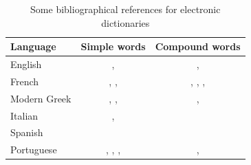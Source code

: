 \begin{table}[!h]
\begin{center}
\begin{tabular}{|l|c|c|}
\hline
\textbf{Language} & \textbf{Simple words} & \textbf{Compound words} \\
\hline
English & \cite{klarsfeld}, \cite{monceaux-1995} & \cite{delac-anglais},
\cite{these-Savary} \\
\hline
French & \cite{formes-ambigues}, \cite{dicos-francais}, \cite{jacques-1995} & \cite{dicos-francais},
\cite{Gross96},
\cite{max-1993},
\cite{syntaxe-de-ladverbe} \\
\hline
Modern Greek & \cite{modern-greek}, \cite{matthieu-anastasia}, \cite{these-tita} & \cite{tita-2002},
\cite{anastasia-2002} \\
\hline
Italian & \cite{delaf-italien}, \cite{delaf-italien-book} & \cite{composes-italien} \\
\hline
Spanish & \cite{blanco-2000} & \cite{blanco-1997} \\
\hline
Portuguese & \cite{eleuterio1995}, \cite{ranchhod1996b}, \cite{ranchhodd1998},
\cite{muniz2005} & \cite{ranchhod1991}, \cite{ranchhodd1998} \\
\hline
\end{tabular}
\caption{Some bibliographical references for electronic dictionaries\label{ref-dicos}}
\end{center}
\end{table}

